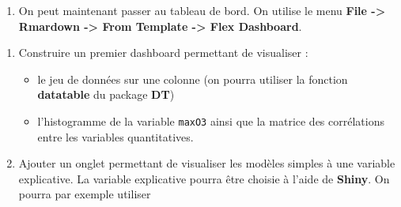 \documentclass[]{book}
\newenvironment{Shaded}{\begin{snugshade}}{\end{snugshade}}
\newcommand{\DataTypeTok}[1]{\textcolor[rgb]{0.13,0.29,0.53}{#1}}
\newcommand{\KeywordTok}[1]{\textcolor[rgb]{0.13,0.29,0.53}{\textbf{#1}}}
\newcommand{\NormalTok}[1]{#1}
\newcommand{\OperatorTok}[1]{\textcolor[rgb]{0.81,0.36,0.00}{\textbf{#1}}}
\newcommand{\StringTok}[1]{\textcolor[rgb]{0.31,0.60,0.02}{#1}}
\providecommand{\tightlist}{%
  \setlength{\itemsep}{0pt}\setlength{\parskip}{0pt}}
\theoremstyle{definition}
\theoremstyle{definition}
\theoremstyle{definition}
\theoremstyle{remark}
\begin{document}
\begin{Shaded}
\end{Shaded}

\begin{enumerate}
\def\labelenumi{\arabic{enumi}.}
\setcounter{enumi}{1}
\tightlist
\item
  On peut maintenant passer au tableau de bord. On utilise le menu \textbf{File -\textgreater{} Rmardown -\textgreater{} From Template -\textgreater{} Flex Dashboard}.
\end{enumerate}

\begin{enumerate}
\def\labelenumi{\alph{enumi}.}
\tightlist
\item
  Construire un premier dashboard permettant de visualiser :

  \begin{itemize}
  \tightlist
  \item
    le jeu de données sur une colonne (on pourra utiliser la fonction \textbf{datatable} du package \textbf{DT})
  \item
    l'histogramme de la variable \texttt{maxO3} ainsi que la matrice des corrélations entre les variables quantitatives.
  \end{itemize}
\item
  Ajouter un onglet permettant de visualiser les modèles simples à une variable explicative. La variable explicative pourra être choisie à l'aide de \textbf{Shiny}. On pourra par exemple utiliser
\end{enumerate}
\end{document}
